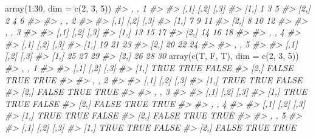 \documentclass[
]{book}
\newenvironment{Shaded}{\begin{snugshade}}{\end{snugshade}}
\newcommand{\AttributeTok}[1]{\textcolor[rgb]{0.77,0.63,0.00}{#1}}
\newcommand{\CommentTok}[1]{\textcolor[rgb]{0.56,0.35,0.01}{\textit{#1}}}
\newcommand{\DecValTok}[1]{\textcolor[rgb]{0.00,0.00,0.81}{#1}}
\newcommand{\FunctionTok}[1]{\textcolor[rgb]{0.00,0.00,0.00}{#1}}
\newcommand{\NormalTok}[1]{#1}
\newcommand{\SpecialCharTok}[1]{\textcolor[rgb]{0.00,0.00,0.00}{#1}}
\begin{document}
\begin{Shaded}
\begin{Highlighting}[]
\FunctionTok{array}\NormalTok{(}\DecValTok{1}\SpecialCharTok{:}\DecValTok{30}\NormalTok{, }\AttributeTok{dim =} \FunctionTok{c}\NormalTok{(}\DecValTok{2}\NormalTok{, }\DecValTok{3}\NormalTok{, }\DecValTok{5}\NormalTok{))}
\CommentTok{\#\textgreater{} , , 1}
\CommentTok{\#\textgreater{} }
\CommentTok{\#\textgreater{}      [,1] [,2] [,3]}
\CommentTok{\#\textgreater{} [1,]    1    3    5}
\CommentTok{\#\textgreater{} [2,]    2    4    6}
\CommentTok{\#\textgreater{} }
\CommentTok{\#\textgreater{} , , 2}
\CommentTok{\#\textgreater{} }
\CommentTok{\#\textgreater{}      [,1] [,2] [,3]}
\CommentTok{\#\textgreater{} [1,]    7    9   11}
\CommentTok{\#\textgreater{} [2,]    8   10   12}
\CommentTok{\#\textgreater{} }
\CommentTok{\#\textgreater{} , , 3}
\CommentTok{\#\textgreater{} }
\CommentTok{\#\textgreater{}      [,1] [,2] [,3]}
\CommentTok{\#\textgreater{} [1,]   13   15   17}
\CommentTok{\#\textgreater{} [2,]   14   16   18}
\CommentTok{\#\textgreater{} }
\CommentTok{\#\textgreater{} , , 4}
\CommentTok{\#\textgreater{} }
\CommentTok{\#\textgreater{}      [,1] [,2] [,3]}
\CommentTok{\#\textgreater{} [1,]   19   21   23}
\CommentTok{\#\textgreater{} [2,]   20   22   24}
\CommentTok{\#\textgreater{} }
\CommentTok{\#\textgreater{} , , 5}
\CommentTok{\#\textgreater{} }
\CommentTok{\#\textgreater{}      [,1] [,2] [,3]}
\CommentTok{\#\textgreater{} [1,]   25   27   29}
\CommentTok{\#\textgreater{} [2,]   26   28   30}
\FunctionTok{array}\NormalTok{(}\FunctionTok{c}\NormalTok{(T, F, T), }\AttributeTok{dim =} \FunctionTok{c}\NormalTok{(}\DecValTok{2}\NormalTok{, }\DecValTok{3}\NormalTok{, }\DecValTok{5}\NormalTok{))}
\CommentTok{\#\textgreater{} , , 1}
\CommentTok{\#\textgreater{} }
\CommentTok{\#\textgreater{}       [,1] [,2]  [,3]}
\CommentTok{\#\textgreater{} [1,]  TRUE TRUE FALSE}
\CommentTok{\#\textgreater{} [2,] FALSE TRUE  TRUE}
\CommentTok{\#\textgreater{} }
\CommentTok{\#\textgreater{} , , 2}
\CommentTok{\#\textgreater{} }
\CommentTok{\#\textgreater{}       [,1] [,2]  [,3]}
\CommentTok{\#\textgreater{} [1,]  TRUE TRUE FALSE}
\CommentTok{\#\textgreater{} [2,] FALSE TRUE  TRUE}
\CommentTok{\#\textgreater{} }
\CommentTok{\#\textgreater{} , , 3}
\CommentTok{\#\textgreater{} }
\CommentTok{\#\textgreater{}       [,1] [,2]  [,3]}
\CommentTok{\#\textgreater{} [1,]  TRUE TRUE FALSE}
\CommentTok{\#\textgreater{} [2,] FALSE TRUE  TRUE}
\CommentTok{\#\textgreater{} }
\CommentTok{\#\textgreater{} , , 4}
\CommentTok{\#\textgreater{} }
\CommentTok{\#\textgreater{}       [,1] [,2]  [,3]}
\CommentTok{\#\textgreater{} [1,]  TRUE TRUE FALSE}
\CommentTok{\#\textgreater{} [2,] FALSE TRUE  TRUE}
\CommentTok{\#\textgreater{} }
\CommentTok{\#\textgreater{} , , 5}
\CommentTok{\#\textgreater{} }
\CommentTok{\#\textgreater{}       [,1] [,2]  [,3]}
\CommentTok{\#\textgreater{} [1,]  TRUE TRUE FALSE}
\CommentTok{\#\textgreater{} [2,] FALSE TRUE  TRUE}
\end{Highlighting}
\end{Shaded}
\end{document}
